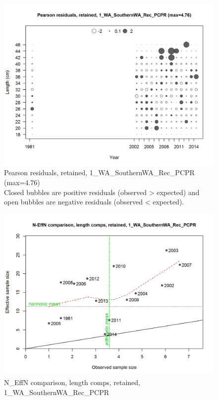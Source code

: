 \documentclass[12pt,]{article}
\begin{document}
\begin{figure}[htbp]
\centering
\includegraphics{./r4ss/plots_mod1/comp_lenfit_residsflt1mkt2.png}
\caption{Pearson residuals, retained, 1\_WA\_SouthernWA\_Rec\_PCPR
(max=4.76)\\
Closed bubbles are positive residuals (observed \textgreater{} expected)
and open bubbles are negative residuals (observed \textless{} expected).
\label{fig:mod1_2_comp_lenfit_residsflt1mkt2}}
\end{figure}

\begin{figure}[htbp]
\centering
\includegraphics{./r4ss/plots_mod1/comp_lenfit_sampsize_flt1mkt2.png}
\caption{N\_EffN comparison, length comps, retained,
1\_WA\_SouthernWA\_Rec\_PCPR
\label{fig:mod1_3_comp_lenfit_sampsize_flt1mkt2}}
\end{figure}
\end{document}
